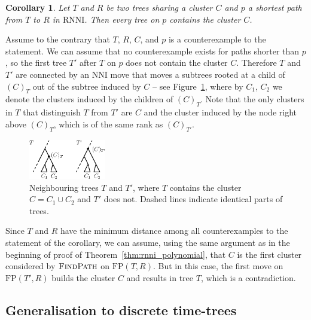 \documentclass[11pt]{amsart}
\newtheorem{corollary}{Corollary}
\newcommand{\rnni}{\mathrm{RNNI}}
\newcommand{\findpath}{\textsc{FindPath}}
\newcommand{\nni}{\mathrm{NNI}}
\newcommand{\fp}{\mathrm{FP}}
\newcommand{\summary}[1]{} %
\begin{document}
\summary{Proving the Cluster Property for $\rnni$}

\begin{corollary}
Let $T$ and $R$ be two trees sharing a cluster $C$ and $p$ a shortest path from $T$ to $R$ in $\rnni$.
Then every tree on $p$ contains the cluster $C$.
\label{cluster_thm}
\end{corollary}

\proof
Assume to the contrary that $T$, $R$, $C$, and $p$ is a counterexample to the statement.
We can assume that no counterexample exists for paths shorter than $p$, so the first tree $T'$ after $T$ on $p$ does not contain the cluster $C$.
Therefore $T$ and $T'$ are connected by an $\nni$ move that moves a subtrees rooted at a child of $(C)_T$ out of the subtree induced by $C$ -- see Figure~\ref{fig:cluster_thm_proof}, where by $C_1$, $C_2$ we denote the clusters induced by the children of $(C)_T$.
Note that the only clusters in $T$ that distinguish $T$ from $T'$ are $C$ and the cluster induced by the node right above $(C)_{T}$, which is of the same rank as $(C)_{T'}$.

\begin{figure}[ht]
\centering
\includegraphics[width=0.3\textwidth]{cluster_thm_proof}
\caption{Neighbouring trees $T$ and $T'$, where $T$ contains the cluster $C = C_1 \cup C_2$ and $T'$ does not.
Dashed lines indicate identical parts of trees.}
\label{fig:cluster_thm_proof}
\end{figure}

Since $T$ and $R$ have the minimum distance among all counterexamples to the statement of the corollary, we can assume, using the same argument as in the beginning of proof of Theorem~\ref{thm:rnni_polynomial}, that $C$ is the first cluster considered by $\findpath$ on $\fp(T, R)$.
But in this case, the first move on $\fp(T',R)$ builds the cluster $C$ and results in tree $T$, which is a contradiction.
\endproof

\subsection{Generalisation to discrete time-trees}
\end{document}
